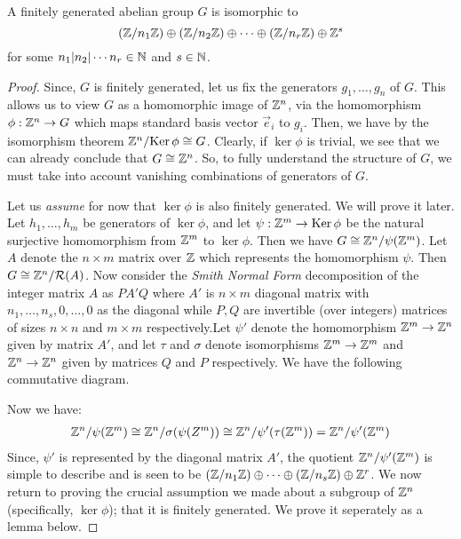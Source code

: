 \documentclass[11pt]{article}
\begin{document}
\begin{theorem}\label{thm:fin-gen-abe-grp}
A finitely generated abelian group $G$ is isomorphic to
\[ (\mathbb{Z}/n_1\mathbb{Z})\oplus (\mathbb{Z}/n_2\mathbb{Z})\oplus \cdots \oplus (\mathbb{Z}/n_r\mathbb{Z})\oplus \mathbb{Z}^s \]
for some $n_1|n_2|\cdots n_r\in \mathbb{N}$ and $s\in \mathbb{N}$.
\end{theorem}
\begin{proof}
Since, $G$ is finitely generated, let us fix the generators $g_1,\ldots,g_n$ of $G$. This allows us to view $G$
as a homomorphic image of $\mathbb{Z}^n$, via the homomorphism $\phi: \mathbb{Z}^n\rightarrow G$ which maps standard basis vector
$\vec{e}_i$ to $g_i$. Then, we have by the isomorphism theorem $\mathbb{Z}^n/\mathrm{Ker}\,\phi\cong G$. Clearly, if $\ker{\phi}$
is trivial, we see that we can already conclude that $G\cong \mathbb{Z}^n$. So, to fully understand the structure of $G$,
we must take into account vanishing combinations of generators of $G$.

Let us {\em assume} for
now that $\ker{\phi}$ is also finitely generated. We will prove it later. Let $h_1,\ldots,h_m$ be generators of
$\ker{\phi}$, and let $\psi: \mathbb{Z}^m\rightarrow \mathrm{Ker}\,\phi$ be the natural surjective homomorphism from $\mathbb{Z}^m$
to $\ker{\phi}$. Then we have $G\cong \mathbb{Z}^n/\psi(\mathbb{Z}^m)$. Let $A$ denote the $n\times m$ matrix over $\mathbb{Z}$ which
represents the homomorphism $\psi$. Then $G\cong \mathbb{Z}^n/\mathcal{R}(A)$. Now consider the {\em Smith Normal Form} decomposition
of the integer matrix $A$ as $PA'Q$ where $A'$ is $n\times m$  diagonal matrix with
$n_1,\ldots,n_s,0,\ldots,0$ as the diagonal while $P,Q$ are
invertible (over integers) matrices of sizes $n\times n$ and $m\times m$ respectively.Let $\psi'$ denote the
homomorphism $\mathbb{Z}^m\rightarrow \mathbb{Z}^n$given by matrix $A'$, and let $\tau$ and $\sigma$ denote isomorphisms
$\mathbb{Z}^m\rightarrow \mathbb{Z}^m$ and $\mathbb{Z}^n\rightarrow \mathbb{Z}^n$ given by matrices $Q$ and $P$ respectively. We have the
following commutative diagram.


Now we have:
\begin{align*}
\mathbb{Z}^n/\psi(\mathbb{Z}^m)\cong \mathbb{Z}^n/\sigma(\psi(Z^m))\cong \mathbb{Z}^n/\psi'(\tau(\mathbb{Z}^m))=\mathbb{Z}^n/\psi'(\mathbb{Z}^m)
\end{align*}
Since, $\psi'$ is represented by the diagonal matrix $A'$, the quotient $\mathbb{Z}^n/\psi'(\mathbb{Z}^m)$ is simple
to describe and is seen to be $(\mathbb{Z}/n_1\mathbb{Z})\oplus \cdots \oplus (\mathbb{Z}/n_s\mathbb{Z})\oplus \mathbb{Z}^r$. We now return to
proving the crucial assumption we made about a subgroup of $\mathbb{Z}^n$ (specifically, $\ker{\phi}$); that it
is finitely generated. We prove it seperately as a lemma below.
\end{proof}
\end{document}
